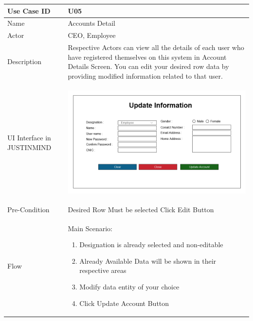 \documentclass[12pt,a4paper]{report}
\begin{document}
\begin{tabular}{ | m{3cm} | m{12cm}| } \hline

Use Case ID &  U05 \\\hline

Name  	    &  Accounts Detail \\ \hline

Actor     	&  CEO, Employee\\ \hline

Description &  Respective Actors can view all the details of each user who have registered themselves on this system in Account Details Screen. You can edit your desired row data by providing modified information related to that user.\\ \hline

UI Interface in JUSTINMIND & \begin{center} \includegraphics[scale=0.3]{./UIs for Latex Reports/UI-005 Update Account@1x.png}\end{center}  \\ \hline

Pre-Condition &  Desired Row Must be selected 
Click Edit Button
 \\ \hline


Flow & Main Scenario:

\begin{enumerate}
\item   Designation is already selected and non-editable
\item  Already Available Data will be shown in their respective areas
\item  Modify data entity of your choice
\item  Click Update Account Button


\end{enumerate}


\end{tabular}
\end{document}

